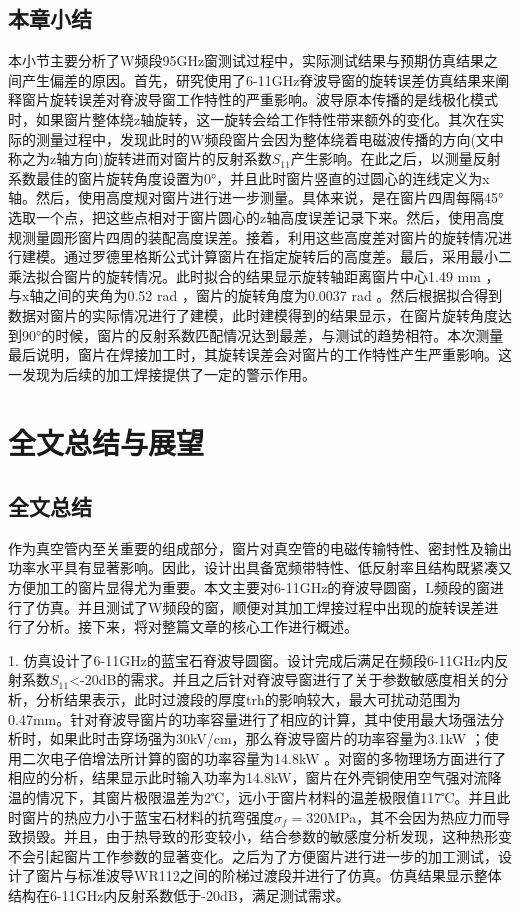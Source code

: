 \documentclass[master]{thesis-uestc}
\begin{document}
\section{本章小结}
本小节主要分析了W频段95GHz窗测试过程中，实际测试结果与预期仿真结果之间产生偏差的原因。首先，研究使用了6-11GHz脊波导窗的旋转误差仿真结果来阐释窗片旋转误差对脊波导窗工作特性的严重影响。波导原本传播的是线极化模式时，如果窗片整体绕z轴旋转，这一旋转会给工作特性带来额外的变化。其次在实际的测量过程中，发现此时的W频段窗片会因为整体绕着电磁波传播的方向(文中称之为z轴方向)旋转进而对窗片的反射系数\(S_{11}\)产生影响。在此之后，以测量反射系数最佳的窗片旋转角度设置为0°，并且此时窗片竖直的过圆心的连线定义为x轴。然后，使用高度规对窗片进行进一步测量。具体来说，是在窗片四周每隔45°选取一个点，把这些点相对于窗片圆心的z轴高度误差记录下来。然后，使用高度规测量圆形窗片四周的装配高度误差。接着，利用这些高度差对窗片的旋转情况进行建模。通过罗德里格斯公式计算窗片在指定旋转后的高度差。最后，采用最小二乘法拟合窗片的旋转情况。此时拟合的结果显示旋转轴距离窗片中心1.49 mm ，与x轴之间的夹角为0.52 rad ，窗片的旋转角度为0.0037 rad 。然后根据拟合得到数据对窗片的实际情况进行了建模，此时建模得到的结果显示，在窗片旋转角度达到90°的时候，窗片的反射系数匹配情况达到最差，与测试的趋势相符。本次测量最后说明，窗片在焊接加工时，其旋转误差会对窗片的工作特性产生严重影响。这一发现为后续的加工焊接提供了一定的警示作用。

\chapter{全文总结与展望}

\section{全文总结}
作为真空管内至关重要的组成部分，窗片对真空管的电磁传输特性、密封性及输出功率水平具有显著影响。因此，设计出具备宽频带特性、低反射率且结构既紧凑又方便加工的窗片显得尤为重要。本文主要对6-11GHz的脊波导圆窗，L频段的窗进行了仿真。并且测试了W频段的窗，顺便对其加工焊接过程中出现的旋转误差进行了分析。接下来，将对整篇文章的核心工作进行概述。

1. 仿真设计了6-11GHz的蓝宝石脊波导圆窗。设计完成后满足在频段6-11GHz内反射系数\(S_{11}\)<-20dB的需求。并且之后针对脊波导窗进行了关于参数敏感度相关的分析，分析结果表示，此时过渡段的厚度trh的影响较大，最大可扰动范围为0.47mm。针对脊波导窗片的功率容量进行了相应的计算，其中使用最大场强法分析时，如果此时击穿场强为30kV/cm，那么脊波导窗片的功率容量为3.1kW ；使用二次电子倍增法所计算的窗的功率容量为14.8kW 。对窗的多物理场方面进行了相应的分析，结果显示此时输入功率为14.8kW，窗片在外壳铜使用空气强对流降温的情况下，其窗片极限温差为2℃，远小于窗片材料的温差极限值117℃。并且此时窗片的热应力小于蓝宝石材料的抗弯强度\(\sigma_f = 320\)MPa，其不会因为热应力而导致损毁。并且，由于热导致的形变较小，结合参数的敏感度分析发现，这种热形变不会引起窗片工作参数的显著变化。之后为了方便窗片进行进一步的加工测试，设计了窗片与标准波导WR112之间的阶梯过渡段并进行了仿真。仿真结果显示整体结构在6-11GHz内反射系数低于-20dB，满足测试需求。
\end{document}
